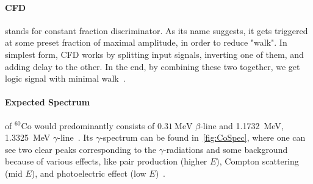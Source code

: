 

\paragraph{CFD} stands for constant fraction discriminator. As its name suggests, it gets triggered at some preset fraction of maximal amplitude, in order to reduce "walk". In simplest form, CFD works by splitting input signals, inverting one of them, and adding delay to the other. In the end, by combining these two together, we get logic signal with minimal walk~\cite{CFDmanual}.





\paragraph{Expected Spectrum} of ${}^{60} \text{Co}$ would predominantly consists of $\SI{0.31}{\mega\eV}$ $\beta$-line and \SI{1.1732}{\mega\eV}, \SI{1.3325}{\mega\eV} $\gamma$-line~\cite{firestone}. Its $\gamma$-spectrum can be found in~\ref{fig:CoSpec}, where one can see two clear peaks corresponding to the $\gamma$-radiations and some background because of various effects, like pair production (higher $E$), Compton scattering (mid $E$), and photoelectric effect (low $E$)~\cite{wermes}.

